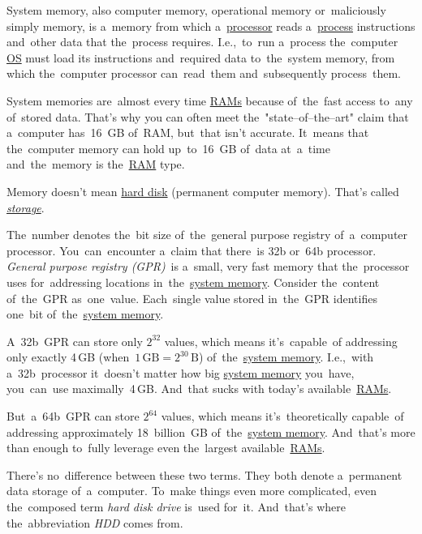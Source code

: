 \label{systemmemory}
System memory, also computer memory, operational memory or~maliciously simply memory, is a~memory from which a~\hyperref[processorcpucore]{processor} reads a~\hyperref[applicationprocessprogramservicethread]{process} instructions and~other data that the~process requires. I.e.,~to~run a~process the~computer \hyperref[os]{OS} must load its instructions and~required data to~the~system memory, from which the~computer processor can~read~them and~subsequently process~them.

System memories are~almost every time \hyperref[ram]{RAMs} because of~the~fast access to~any of~stored data. That's why you can often meet the~"state--of--the--art" claim that a~computer has~16~GB of~RAM, but~that isn't accurate. It~means that the~computer memory can hold up~to~16~GB of~data at~a~time and~the~memory is the~\hyperref[ram]{RAM} type.

\warning Memory doesn't mean \hyperref[harddiskdrive]{hard disk} (permanent computer memory). That's called \hyperref[harddiskdrive]{\textit{storage}}.

\label{32bvs64b}
The~number denotes the~bit size of~the~general purpose registry of~a~computer processor. You~can~encounter a~claim that there~is 32b or~64b processor. \textit{General purpose registry (GPR)}~is a~small, very fast memory that the~processor uses for~addressing locations in~the~\hyperref[systemmemory]{system memory}. Consider the~content of~the~GPR as~one~value. Each~single value stored in~the~GPR identifies one~bit of~the~\hyperref[systemmemory]{system memory}.

A~32b~GPR can store only $2^{32}$ values, which means it's~capable~of addressing only exactly 4\,GB (when~$1\,\textrm{GB}=2^{30}\,\textrm{B}$) of~the~\hyperref[systemmemory]{system memory}. I.e.,~with a~32b~processor it~doesn't matter how big \hyperref[systemmemory]{system memory} you~have, you~can~use maximally~4\,GB. And~that sucks with today's available~\hyperref[ram]{RAMs}.

But~a~64b~GPR can store $2^{64}$ values, which means it's~theoretically capable~of addressing approximately 18~billion~GB of~the~\hyperref[systemmemory]{system memory}. And~that's more than enough to~fully leverage even the~largest available~\hyperref[ram]{RAMs}.

\label{harddiskdrive}
There's no~difference between these two terms. They both denote a~permanent data storage of~a~computer. To~make things even more complicated, even the~composed term \textit{hard disk drive} is~used for~it. And~that's where the~abbreviation \textit{HDD} comes from.

